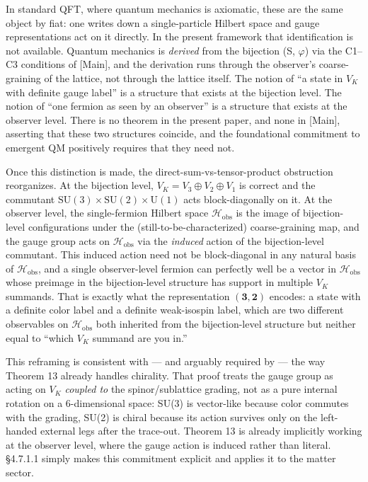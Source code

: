 \documentclass[
]{article}
\begin{document}
In standard QFT, where quantum mechanics is axiomatic, these are the
same object by fiat: one writes down a single-particle Hilbert space and
gauge representations act on it directly. In the present framework that
identification is not available. Quantum mechanics is \emph{derived}
from the bijection (S, \(\varphi\)) via the C1--C3 conditions of
{[}Main{]}, and the derivation runs through the observer's
coarse-graining of the lattice, not through the lattice itself. The
notion of ``a state in \(V_K\) with definite gauge label'' is a
structure that exists at the bijection level. The notion of ``one
fermion as seen by an observer'' is a structure that exists at the
observer level. There is no theorem in the present paper, and none in
{[}Main{]}, asserting that these two structures coincide, and the
foundational commitment to emergent QM positively requires that they
need not.

Once this distinction is made, the direct-sum-vs-tensor-product
obstruction reorganizes. At the bijection level,
\(V_K = V_3 \oplus V_2 \oplus V_1\) is correct and the commutant
\(\mathrm{SU}(3) \times \mathrm{SU}(2) \times \mathrm{U}(1)\) acts
block-diagonally on it. At the observer level, the single-fermion
Hilbert space \(\mathcal{H}_{\text{obs}}\) is the image of
bijection-level configurations under the (still-to-be-characterized)
coarse-graining map, and the gauge group acts on
\(\mathcal{H}_{\text{obs}}\) via the \emph{induced} action of the
bijection-level commutant. This induced action need not be
block-diagonal in any natural basis of \(\mathcal{H}_{\text{obs}}\), and
a single observer-level fermion can perfectly well be a vector in
\(\mathcal{H}_{\text{obs}}\) whose preimage in the bijection-level
structure has support in multiple \(V_K\) summands. That is exactly what
the representation \((\mathbf{3}, \mathbf{2})\) encodes: a state with a
definite color label and a definite weak-isospin label, which are two
different observables on \(\mathcal{H}_{\text{obs}}\) both inherited
from the bijection-level structure but neither equal to ``which \(V_K\)
summand are you in.''

This reframing is consistent with --- and arguably required by --- the
way Theorem 13 already handles chirality. That proof treats the gauge
group as acting on \(V_K\) \emph{coupled to} the spinor/sublattice
grading, not as a pure internal rotation on a 6-dimensional space: SU(3)
is vector-like because color commutes with the grading, SU(2) is chiral
because its action survives only on the left-handed external legs after
the trace-out. Theorem 13 is already implicitly working at the observer
level, where the gauge action is induced rather than literal. §4.7.1.1
simply makes this commitment explicit and applies it to the matter
sector.
\end{document}
